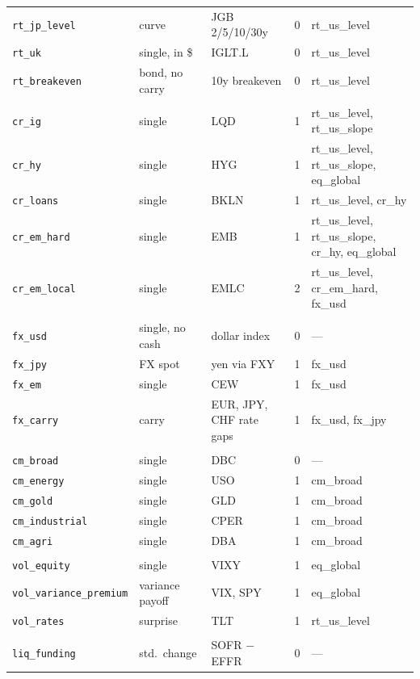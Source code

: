 \documentclass[11pt,a4paper]{article}
\newcommand{\fid}[1]{\texttt{#1}}
\begin{document}
{\begin{longtable}{@{}>{\ttfamily}l >{\raggedright\arraybackslash}p{1.9cm} >{\raggedright\arraybackslash}p{3.4cm} c >{\ttfamily\raggedright\arraybackslash}p{3.9cm}@{}}
\fid{rt\_jp\_level} & curve & JGB 2/5/10/30y & 0 & rt\_us\_level \\
\fid{rt\_uk} & single, in \$ & IGLT.L & 0 & rt\_us\_level \\
\fid{rt\_breakeven} & bond, no carry & 10y breakeven & 0 & rt\_us\_level \\
\multicolumn{5}{@{}l}{\textit{Credit}}\\
\fid{cr\_ig} & single & LQD & 1 & rt\_us\_level, rt\_us\_slope \\
\fid{cr\_hy} & single & HYG & 1 & rt\_us\_level, rt\_us\_slope, eq\_global \\
\fid{cr\_loans} & single & BKLN & 1 & rt\_us\_level, cr\_hy \\
\fid{cr\_em\_hard} & single & EMB & 1 & rt\_us\_level, rt\_us\_slope, cr\_hy, eq\_global \\
\fid{cr\_em\_local} & single & EMLC & 2 & rt\_us\_level, cr\_em\_hard, fx\_usd \\
\multicolumn{5}{@{}l}{\textit{FX}}\\
\fid{fx\_usd} & single, no cash & dollar index & 0 & \textnormal{---} \\
\fid{fx\_jpy} & FX spot & yen via FXY & 1 & fx\_usd \\
\fid{fx\_em} & single & CEW & 1 & fx\_usd \\
\fid{fx\_carry} & carry & EUR, JPY, CHF rate gaps & 1 & fx\_usd, fx\_jpy \\
\multicolumn{5}{@{}l}{\textit{Commodities}}\\
\fid{cm\_broad} & single & DBC & 0 & \textnormal{---} \\
\fid{cm\_energy} & single & USO & 1 & cm\_broad \\
\fid{cm\_gold} & single & GLD & 1 & cm\_broad \\
\fid{cm\_industrial} & single & CPER & 1 & cm\_broad \\
\fid{cm\_agri} & single & DBA & 1 & cm\_broad \\
\multicolumn{5}{@{}l}{\textit{Volatility}}\\
\fid{vol\_equity} & single & VIXY & 1 & eq\_global \\
\fid{vol\_variance\_premium} & variance payoff & VIX, SPY & 1 & eq\_global \\
\fid{vol\_rates} & surprise & TLT & 1 & rt\_us\_level \\
\multicolumn{5}{@{}l}{\textit{Liquidity and stress}}\\
\fid{liq\_funding} & std.\ change & SOFR $-$ EFFR & 0 & \textnormal{---} \\

\end{longtable}}
\end{document}
